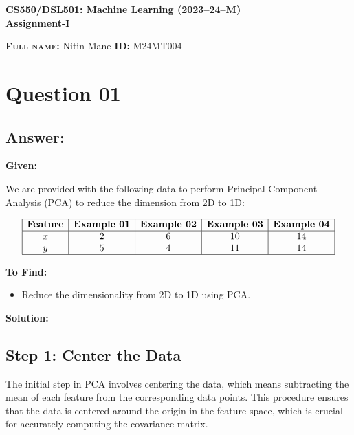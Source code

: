\documentclass{exam}
\begin{document}
\begin{center}
\textbf{CS550/DSL501: Machine Learning (2023--24--M)} \\
\textbf{Assignment-I}
\end{center}

\vspace{0.2in}

\noindent
\textsc{\textbf{Full name:}} Nitin Mane \hspace{1in} \textsc{\textbf{ID:}} M24MT004

\vspace{0.2in}

\section{Question 01}

\subsection{Answer:}

\textbf{Given:}

We are provided with the following data to perform Principal Component Analysis (PCA) to reduce the dimension from 2D to 1D:

\[
\begin{array}{|c|c|c|c|c|}
\hline
\textbf{Feature} & \textbf{Example 01} & \textbf{Example 02} & \textbf{Example 03} & \textbf{Example 04} \\
\hline
x & 2 & 6 & 10 & 14 \\
y & 5 & 4 & 11 & 14 \\
\hline
\end{array}
\]

\textbf{To Find:} 
\begin{itemize}
    \item Reduce the dimensionality from 2D to 1D using PCA.
\end{itemize}

\textbf{Solution:}

\subsection{Step 1: Center the Data}

The initial step in PCA involves centering the data, which means subtracting the mean of each feature from the corresponding data points. This procedure ensures that the data is centered around the origin in the feature space, which is crucial for accurately computing the covariance matrix.
\end{document}
